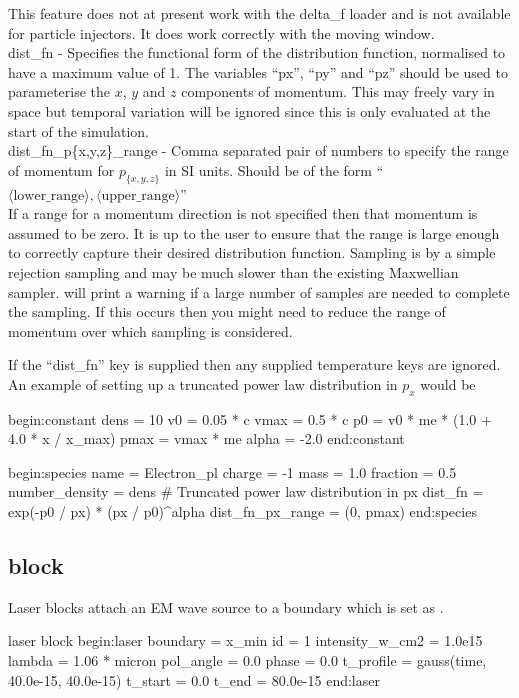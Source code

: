This feature does not at present work with the delta\_f loader and is not
available for particle injectors. It does work correctly with the moving
window.\\

{\emphtext dist\_fn} - Specifies the functional form of the distribution
  function, normalised to have a maximum value of 1. The variables
  ``px'', ``py'' and ``pz'' should be used to parameterise the $x$, $y$ and $z$
  components of momentum. This may freely vary in space but temporal variation
  will be ignored since this is only evaluated at the start of the simulation.\\

{\emphtext dist\_fn\_p\{x,y,z\}\_range} - Comma separated pair of numbers to
  specify the range of momentum for $p_{\{x,y,z\}}$ in SI units. Should be of
  the form
  ``$\langle\mbox{lower\_range}\rangle, \langle\mbox{upper\_range}\rangle$''\\

If a range for a momentum direction is not specified then that momentum is
assumed to be zero. It is up to the user to ensure that the range is large
enough to correctly capture their desired distribution function. Sampling is by
a simple rejection sampling and may be much slower than the existing Maxwellian
sampler. \EPOCH will print a warning if a large number of samples are needed to
complete the sampling. If this occurs then you might need to reduce the range
of momentum over which sampling is considered.

If the ``dist\_fn'' key is supplied then any supplied temperature keys are
ignored.  An example of setting up a truncated power law distribution in
$p_x$ would be
\begin{boxverbatim}
begin:constant
  dens = 10
  v0 = 0.05 * c
  vmax = 0.5 * c
  p0 = v0 * me * (1.0 + 4.0 * x / x_max)
  pmax = vmax * me
  alpha = -2.0
end:constant

begin:species
  name = Electron_pl
  charge = -1
  mass = 1.0
  fraction = 0.5
  number_density = dens
  # Truncated power law distribution in px
  dist_fn = exp(-p0 / px) * (px / p0)^alpha
  dist_fn_px_range = (0, pmax)
end:species
\end{boxverbatim}


\subsection{\texorpdfstring
  { block}
  {           {laser} block}}
\label{sec:laser_block}
Laser blocks attach an EM wave source to a boundary which is set as
.
\begin{lboxverbatim}{laser block}
begin:laser
   boundary = x_min
   id = 1
   intensity_w_cm2 = 1.0e15
   lambda = 1.06 * micron
   pol_angle = 0.0
   phase = 0.0
   t_profile = gauss(time, 40.0e-15, 40.0e-15)
   t_start = 0.0
   t_end = 80.0e-15
end:laser
\end{lboxverbatim}

